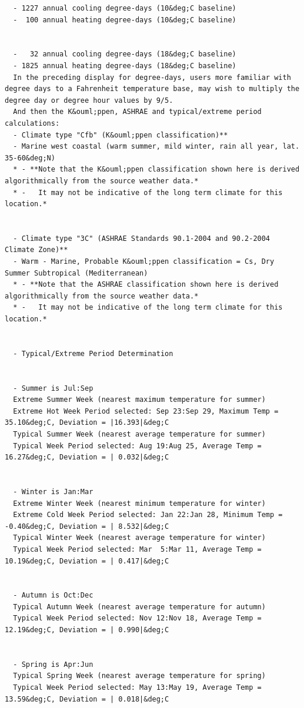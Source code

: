 \begin{lstlisting}
  - 1227 annual cooling degree-days (10&deg;C baseline)
  -  100 annual heating degree-days (10&deg;C baseline)


  -   32 annual cooling degree-days (18&deg;C baseline)
  - 1825 annual heating degree-days (18&deg;C baseline)
  In the preceding display for degree-days, users more familiar with degree days to a Fahrenheit temperature base, may wish to multiply the degree day or degree hour values by 9/5.
  And then the K&ouml;ppen, ASHRAE and typical/extreme period calculations:
  - Climate type "Cfb" (K&ouml;ppen classification)**
  - Marine west coastal (warm summer, mild winter, rain all year, lat. 35-60&deg;N)
  * - **Note that the K&ouml;ppen classification shown here is derived algorithmically from the source weather data.*
  * -   It may not be indicative of the long term climate for this location.*


  - Climate type "3C" (ASHRAE Standards 90.1-2004 and 90.2-2004 Climate Zone)**
  - Warm - Marine, Probable K&ouml;ppen classification = Cs, Dry Summer Subtropical (Mediterranean)
  * - **Note that the ASHRAE classification shown here is derived algorithmically from the source weather data.*
  * -   It may not be indicative of the long term climate for this location.*


  - Typical/Extreme Period Determination


  - Summer is Jul:Sep
  Extreme Summer Week (nearest maximum temperature for summer)
  Extreme Hot Week Period selected: Sep 23:Sep 29, Maximum Temp =  35.10&deg;C, Deviation = |16.393|&deg;C
  Typical Summer Week (nearest average temperature for summer)
  Typical Week Period selected: Aug 19:Aug 25, Average Temp =  16.27&deg;C, Deviation = | 0.032|&deg;C


  - Winter is Jan:Mar
  Extreme Winter Week (nearest minimum temperature for winter)
  Extreme Cold Week Period selected: Jan 22:Jan 28, Minimum Temp =  -0.40&deg;C, Deviation = | 8.532|&deg;C
  Typical Winter Week (nearest average temperature for winter)
  Typical Week Period selected: Mar  5:Mar 11, Average Temp =  10.19&deg;C, Deviation = | 0.417|&deg;C


  - Autumn is Oct:Dec
  Typical Autumn Week (nearest average temperature for autumn)
  Typical Week Period selected: Nov 12:Nov 18, Average Temp =  12.19&deg;C, Deviation = | 0.990|&deg;C


  - Spring is Apr:Jun
  Typical Spring Week (nearest average temperature for spring)
  Typical Week Period selected: May 13:May 19, Average Temp =  13.59&deg;C, Deviation = | 0.018|&deg;C
\end{lstlisting}

